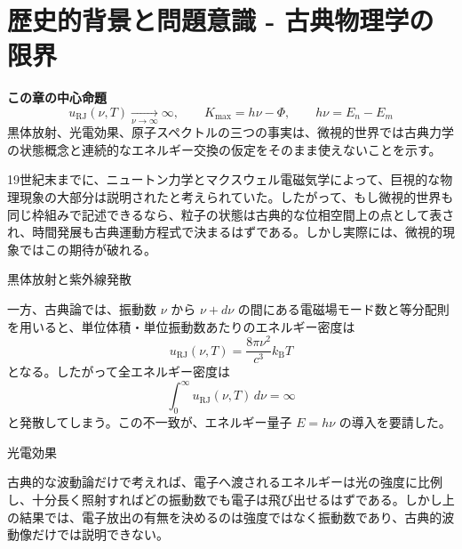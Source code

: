 \section{歴史的背景と問題意識 - 古典物理学の限界}

\noindent\textbf{この章の中心命題}
\[
\boxed{
u_{\mathrm{RJ}}(\nu,T)\xrightarrow[\nu\to\infty]{}\infty,\qquad
K_{\max}=h\nu-\Phi,\qquad
h\nu=E_n-E_m
}
\]
黒体放射、光電効果、原子スペクトルの三つの事実は、微視的世界では古典力学の状態概念と連続的なエネルギー交換の仮定をそのまま使えないことを示す。

19世紀末までに、ニュートン力学とマクスウェル電磁気学によって、巨視的な物理現象の大部分は説明されたと考えられていた。したがって、もし微視的世界も同じ枠組みで記述できるなら、粒子の状態は古典的な位相空間上の点として表され、時間発展も古典運動方程式で決まるはずである。しかし実際には、微視的現象ではこの期待が破れる。

\begin{experimentalfact}{黒体放射と紫外線発散}
\end{experimentalfact}

一方、古典論では、振動数 $\nu$ から $\nu+d\nu$ の間にある電磁場モード数と等分配則を用いると、単位体積・単位振動数あたりのエネルギー密度は
\[
u_{\mathrm{RJ}}(\nu,T)=\frac{8\pi \nu^2}{c^3}k_{\mathrm{B}}T
\]
となる。したがって全エネルギー密度は
\[
\int_0^\infty u_{\mathrm{RJ}}(\nu,T)\,d\nu = \infty
\]
と発散してしまう。この不一致が、エネルギー量子 $E=h\nu$ の導入を要請した。

\begin{experimentalfact}{光電効果}
\end{experimentalfact}

古典的な波動論だけで考えれば、電子へ渡されるエネルギーは光の強度に比例し、十分長く照射すればどの振動数でも電子は飛び出せるはずである。しかし上の結果では、電子放出の有無を決めるのは強度ではなく振動数であり、古典的波動像だけでは説明できない。

